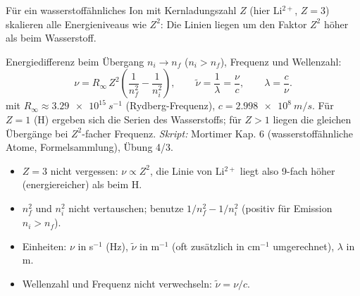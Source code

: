 

Für ein wasserstoffähnliches Ion mit Kernladungszahl $Z$ (hier Li$^{2+}$,
$Z=3$) skalieren alle Energieniveaus wie $Z^2$: Die Linien liegen um den
Faktor $Z^2$ höher als beim Wasserstoff.

\begin{werkzeugkasten}
Energiedifferenz beim Übergang $n_i \to n_f$ ($n_i > n_f$), Frequenz und
Wellenzahl:
\begin{equation}
  \nu = R_\infty\,Z^2\left(\frac{1}{n_f^2} - \frac{1}{n_i^2}\right),
  \qquad
  \tilde\nu = \frac{1}{\lambda} = \frac{\nu}{c},
  \qquad \lambda = \frac{c}{\nu}.
\end{equation}
mit $R_\infty \approx \qty{3.29e15}{s^{-1}}$ (Rydberg-Frequenz),
$c = \qty{2.998e8}{m/s}$. Für $Z=1$ (H) ergeben sich die Serien des
Wasserstoffs; für $Z>1$ liegen die gleichen Übergänge bei $Z^2$-facher
Frequenz.
\textit{Skript:} Mortimer Kap. 6 (wasserstoffähnliche Atome,
Formelsammlung), Übung 4/3.
\end{werkzeugkasten}

\begin{achtung}
\begin{itemize}
  \item $Z = 3$ nicht vergessen: $\nu \propto Z^2$, die Linie von Li$^{2+}$
        liegt also 9-fach höher (energiereicher) als beim H.
  \item $n_f^2$ und $n_i^2$ nicht vertauschen; benutze $1/n_f^2 - 1/n_i^2$
        (positiv für Emission $n_i > n_f$).
  \item Einheiten: $\nu$ in s$^{-1}$ (Hz), $\tilde\nu$ in m$^{-1}$
        (oft zusätzlich in cm$^{-1}$ umgerechnet), $\lambda$ in m.
  \item Wellenzahl und Frequenz nicht verwechseln: $\tilde\nu = \nu/c$.
\end{itemize}
\end{achtung}
